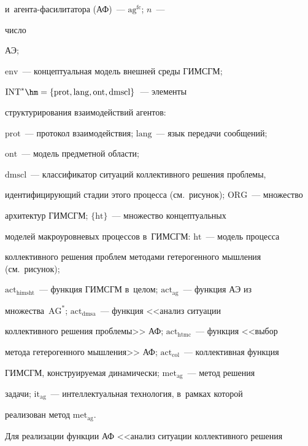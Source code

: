 и~аген\-та-фа\-си\-ли\-та\-то\-ра (АФ)~--- $\mathrm{ag}^{\mathrm{fc}}$; $n$~--- 


чис\-ло\linebreak


 АЭ;  


$\mathrm{env}$~--- концептуальная модель внешней среды ГИМСГМ; 


$\mathrm{INT}^*\hm= \{\mathrm{prot}, 


\mathrm{lang}, \mathrm{ont}, \mathrm{dmscl}\}$~--- элементы 


структурирования взаимодействий агентов: 


$\mathrm{prot}$~--- протокол взаимодействия; $\mathrm{lang}$~---  язык передачи сообщений; 


$\mathrm{ont}$~--- модель предметной об\-ласти;  


$\mathrm{dmscl}$~--- классификатор ситуаций коллективного решения проб\-ле\-мы, 


идентифицирующий стадии этого процесса (см.\ рисунок); $\mathrm{ORG}$~---  мно\-же\-ст\-во 


архитектур ГИМСГМ; $\{\mathrm{ht}\}$~--- множество концептуальных 


моделей макроуровневых процессов в~\mbox{ГИМСГМ}: $\mathrm{ht}$~--- модель процесса 


коллективного решения проб\-лем методами гетерогенного мышления (см.\ рисунок); 


$\mathrm{act}_{\mathrm{himsht}}$~--- функция ГИМСГМ в~целом; $\mathrm{act}_{\mathrm{ag}}$~--- функция АЭ из 


множества~$\mathrm{AG}^*$; $\mathrm{act}_{\mathrm{dmsa}}$~--- функция <<анализ ситуации 


коллективного решения проб\-ле\-мы>> АФ; $\mathrm{act}_{\mathrm{htmc}}$~--- функция <<выбор 


метода гетерогенного мышления>> АФ; $\mathrm{act}_{\mathrm{col}}$~--- коллективная функция 


ГИМСГМ, конструируемая динамически; $\mathrm{met}_{\mathrm{ag}}$~--- метод решения 


задачи; $\mathrm{it}_{\mathrm{ag}}$~--- интеллектуальная технология, в~рамках которой 


реализован метод $\mathrm{met}_{\mathrm{ag}}$.





  


  Для реализации функции АФ <<анализ ситуации коллективного решения 


